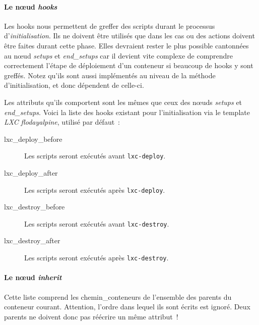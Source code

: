 \paragraph{Le nœud \emph{hooks}}

Les hooks nous permettent de greffer des scripts durant le processus d'\emph{initialisation}.
Ils ne doivent être utilisés que dans les cas ou des actions doivent être faites durant cette phase.
Elles devraient rester le plus possible cantonnées au nœud \emph{setups} et \emph{end\_setups} car il devient vite complexe de comprendre correctement l'étape de déploiement d'un conteneur si beaucoup de hooks y sont greffés.
Notez qu'ils sont aussi implémentés au niveau de la méthode d'\gls{initialisation}, et donc dépendent de celle-ci.

Les attributs qu'ils comportent sont les mêmes que ceux des nœuds \emph{setups} et \emph{end\_setups}.
Voici la liste des hooks existant pour l'initialisation via le template \emph{LXC} \emph{flodayalpine}, utilisé par défaut~:

\begin{description}
	\item[lxc\_deploy\_before] Les scripts seront exécutés avant {\tt lxc-deploy}.
	\item[lxc\_deploy\_after] Les scripts seront exécutés après {\tt lxc-deploy}.
	\item[lxc\_destroy\_before] Les scripts seront exécutés avant {\tt lxc-destroy}.
	\item[lxc\_destroy\_after] Les scripts seront exécutés après {\tt lxc-destroy}.
\end{description}

\paragraph{Le nœud \emph{inherit}}
Cette liste comprend les \glspl{chemin_conteneur} de l'ensemble des parents du conteneur courant.
Attention, l'ordre dans lequel ils sont écrits est ignoré.
Deux parents ne doivent donc pas réécrire un même \gls{attribut} !

